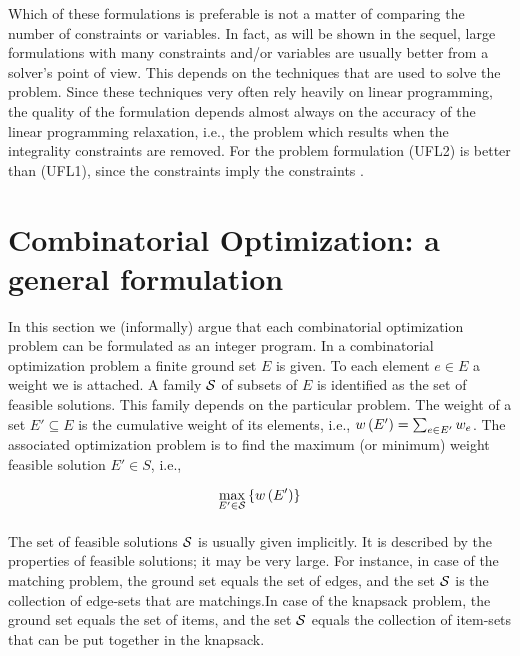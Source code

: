Which of these formulations is preferable is not a matter of comparing the number of constraints or variables. In fact, as will be shown in the sequel, large formulations with many constraints and/or variables are usually better from a solver's point of view. This depends on the techniques that are used to solve the problem. Since these techniques very often rely heavily on linear programming, the quality of the formulation depends almost always on the accuracy of the linear programming relaxation, i.e., the problem which results when the integrality constraints are removed. For the  problem formulation (UFL2) is better than (UFL1), since the constraints  imply the constraints .

\section{Combinatorial Optimization: a general formulation}
In this section we (informally) argue that each combinatorial optimization problem can be formulated as an integer program. In a combinatorial optimization problem a finite ground set $E$ is given. To each
element $e\in E$ a weight we is attached. A family $\calS$ of subsets of $E$ is identified as the set of feasible solutions. This family depends on the particular problem. The weight of a set $E'\subseteq E$ is the cumulative weight of its elements, i.e., $\fun{w}{E'}=\isumdomain[e]{E'}{w_e}$. The associated optimization problem is to find the maximum (or minimum) weight feasible solution $E'\in S$, i.e.,

\begin{equation}
\displaystyle\max_{E'\in\calS}\accl{\fun{w}{E'}}
\end{equation}

\paragraph{}
The set of feasible solutions $\calS$ is usually given implicitly. It is described by the properties of feasible solutions; it may be very large. For instance, in case of the matching problem, the ground set equals the set of edges, and the set $\calS$ is the collection of edge-sets that are matchings.In case of the knapsack problem, the ground set equals the set of items, and the set $\calS$ equals the collection of item-sets that can be put together in the knapsack.

